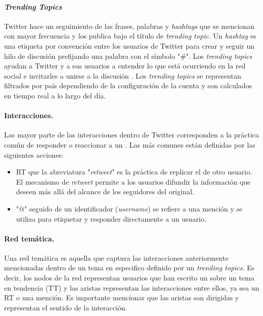 \paragraph{\textit{Trending Topics}}
Twitter hace un seguimiento de las frases, palabras y \textit{hashtags} que se mencionan con mayor frecuencia y los publica bajo el título de \textit{trending topic}. Un \textit{hashtag} es una etiqueta por convención entre los usuarios de Twitter para crear y seguir un hilo de discusión prefijando una palabra con el símbolo "\#". Los \textit{trending topics} ayudan a Twitter y a sus usuarios a entender lo que está ocurriendo en la red social e invitarles a unirse a la discusión \cite{twitter_twittercom_nodate}. Los \textit{trending topics} se representan filtrados por país dependiendo de la configuración de la cuenta y son calculados en tiempo real a lo largo del día. 

\paragraph{Interacciones.} Las mayor parte de las interacciones dentro de Twitter corresponden a la práctica común de responder o reaccionar a un \tweet  \cite{kwak_what_2010}. Las más comunes están definidas por las siguientes acciones: 
\begin{itemize}
    \item RT que la abreviatura "\textit{retweet}" es la práctica de replicar el \tweet de otro usuario. El mecanismo de \textit{retweet} permite a los usuarios difundir la información que deseen más allá del alcance de los seguidores del \tweet original.

    \item "@" seguido de un identificador (\textit{username}) se refiere a una mención y se utiliza para etiquetar y responder directamente a un usuario.
\end{itemize}

\paragraph{Red temática.} Una red temática es aquella que captura las interacciones anteriormente mencionadas dentro de un tema en especifico definido por un \textit{trending topics}. Es decir, los nodos de la red representan usuarios que han escrito un \tweet sobre un tema en tendencia (TT) y las aristas representan las interacciones entre ellos, ya sea un RT o una mención. Es importante mencionar que las aristas son dirigidas y representan el sentido de la interacción.

